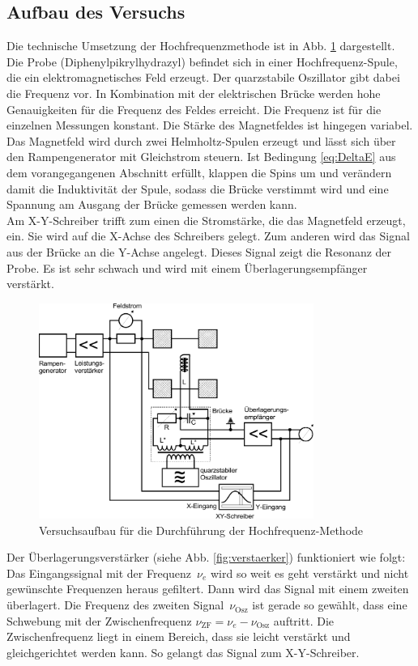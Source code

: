 \subsection{Aufbau des Versuchs}
Die technische Umsetzung der Hochfrequenzmethode ist in Abb. \ref{fig:aufbau} dargestellt. Die Probe (Diphenylpikrylhydrazyl) befindet sich in einer Hochfrequenz-Spule, die ein elektromagnetisches Feld erzeugt. Der quarzstabile Oszillator gibt dabei die Frequenz vor. In Kombination mit der elektrischen Brücke werden hohe Genauigkeiten für die Frequenz des Feldes erreicht. Die Frequenz ist für die einzelnen Messungen konstant. Die Stärke des Magnetfeldes ist hingegen variabel. Das Magnetfeld wird durch zwei Helmholtz-Spulen erzeugt und lässt sich über den Rampengenerator mit Gleichstrom steuern. Ist Bedingung \eqref{eq:DeltaE} aus dem vorangegangenen Abschnitt erfüllt, klappen die Spins um und verändern damit die Induktivität der Spule, sodass die Brücke verstimmt wird und eine Spannung am Ausgang der Brücke gemessen werden kann. \\
Am X-Y-Schreiber trifft zum einen die Stromstärke, die das Magnetfeld erzeugt, ein. Sie wird auf die X-Achse des Schreibers gelegt. Zum anderen wird das Signal aus der Brücke an die Y-Achse angelegt. Dieses Signal zeigt die Resonanz der Probe. Es ist sehr schwach und wird mit einem Überlagerungsempfänger verstärkt.

 \begin{figure}[h!]
	\centering
	\includegraphics[width=0.8\textwidth]{Anleitung_Abb8.pdf}
	\caption[Versuchsaufbau]{Versuchsaufbau für die Durchführung der Hochfrequenz-Methode \cite{V28}}
	\label{fig:aufbau}
\end{figure}
\clearpage
Der Überlagerungsverstärker (siehe Abb. \ref{fig:verstaerker}) funktioniert wie folgt: Das Eingangssignal mit der Frequenz~$\nu_e$ wird so weit es geht verstärkt und nicht gewünschte Frequenzen  heraus gefiltert. Dann wird das Signal mit einem zweiten überlagert. Die Frequenz des zweiten Signal~$\nu_\textrm{Osz}$ ist gerade so gewählt, dass eine Schwebung mit der Zwischenfrequenz $\nu_\textrm{ZF} = \nu_e - \nu_\textrm{Osz}$ auftritt. Die Zwischenfrequenz liegt in einem Bereich, dass sie leicht verstärkt und gleichgerichtet werden kann. So gelangt das Signal zum X-Y-Schreiber.


